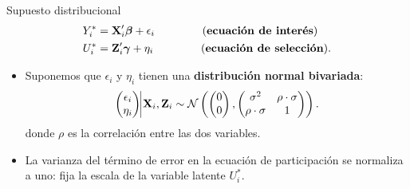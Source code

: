 \documentclass[10pt, xcolor=dvipsnames]{beamer}
\begin{document}
\begin{frame}{Supuesto distribucional}
\begin{align*}
	\begin{split}
		Y^*_i &= \textbf{X}'_i\boldsymbol{\beta} + \epsilon_i \hspace{1.5cm} \text{(\textbf{ecuación de interés})} \\
		U^*_i &= \textbf{Z}'_i\boldsymbol{\gamma} + \eta_i \hspace{1.5cm} \text{(\textbf{ecuación de selección})}.
	\end{split}	
\end{align*}
\begin{itemize}\setlength{\itemsep}{1em}
    \item Suponemos que $\epsilon_i$ y $\eta_i$ tienen una \textbf{distribución normal bivariada}:
\begin{align*}
    \begin{pmatrix}
        \epsilon_i \\
        \eta_i\\
        \end{pmatrix} 
            \vline \XB_i,\ZB_i
            \sim \mathcal{N}
            \left(
            \begin{pmatrix}
                0 \\
                0\\
            \end{pmatrix}, 
        \begin{pmatrix}
    \sigma^2 & \rho \cdot \sigma\\
    \rho \cdot \sigma & 1\\
    \end{pmatrix}
    \right). 
\end{align*}
    donde $\rho$ es la correlación entre las dos variables. \vspace{0.1cm}
    \item La varianza del término de error en la ecuación de participación se normaliza a uno: fija la escala de la variable latente \(U^*_i\).
\end{itemize}
\end{frame}
\end{document}
